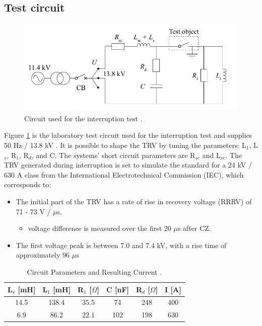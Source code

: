 \documentclass[10pt,a4paper,twoside]{article}
\begin{document}
\newpage
\subsection{Test circuit}

\begin{figure} [H]
\centering
\includegraphics[scale=0.35]{Bilder/Method/circuit.png}
\caption{Circuit used for the interruption test \cite{bib:AFIMVLBA}.} \label{fig:testCurcuit}
\end{figure}

Figure \ref{fig:testCurcuit} is the laboratory test circuit used for the interruption test and supplies 50 Hz / 13.8 kV . It is possible to shape the TRV by tuning the parameters: L$_1$, L$_s$, R$_1$, R$_d$, and C. The systems' short circuit parameters are R$_{sc}$ and L$_{sc}$. The TRV generated during interruption is set to simulate the standard for a 24 kV / 630 A class from the International Electrotechnical Commission (IEC), which corresponds to:

\begin{itemize}
\item The initial part of the TRV has a rate of rise in recovery voltage (RRRV) of 71 - 73 V / $\mu$s.
	\begin{itemize}
		\item voltage difference is measured over the first 20 $\mu$s after CZ.
	\end{itemize}
\item The first voltage peak is between 7.0 and 7.4 kV, with a rise time of approximately 96 $\mu$s
\end{itemize}

\begin{table}[H]
\center
\caption{Circuit Parameters and Resulting Current \cite{bib:AFIMVLBA}. }
\begin{tabular}{|c|c|c|c|c|c|}
\hline 
L$_s$ [mH] & L$_1$ [mH] & R$_1$ [$\Omega$] & C [nF] & R$_{d}$ [$\Omega$] & I [A] \\ 
\hline 
14.5 & 138.4 & 35.5 & 74 & 248 & 400 \\ 
\hline 
6.9 & 86.2 & 22.1 & 102 & 198 & 630 \\ 
\hline 
\end{tabular} 
\label{tab:testParameters}
\end{table}
\end{document}
